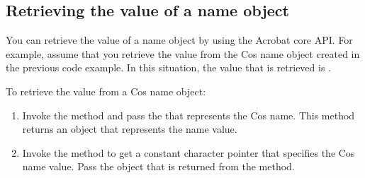 \documentclass[letterpaper,12pt,english,openany,oneside]{sphinxmanual}
\begin{document}
\subsection{Retrieving the value of a name object}
\label{\detokenize{Plugins_Cos:retrieving-the-value-of-a-name-object}}
You can retrieve the value of a name object by using the Acrobat core API. For example, assume that you retrieve the value from the Cos name object created in the previous code example. In this situation, the value that is retrieved is .

To retrieve the value from a Cos name object:
\begin{enumerate}
%
\item {} 
Invoke the  method and pass the  that represents the Cos name. This method returns an  object that represents the name value.

\item {} 
Invoke the  method to get a constant character pointer that specifies the Cos name value. Pass the  object that is returned from the  method.

\end{enumerate}

\begin{sphinxVerbatim}[commandchars=\\\{\}]
   
 
   
      


         
   
     
\end{sphinxVerbatim}
\end{document}
